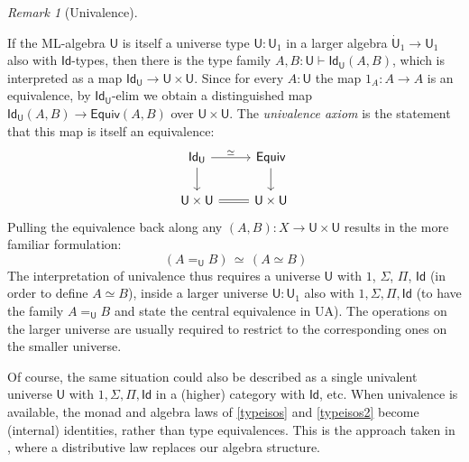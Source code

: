 \documentclass[12pt,reqno]{amsart}
\newcommand{\EE}{\ensuremath{\mathcal{E}}}
\renewcommand{\to}{\ensuremath{\rightarrow}}
\newcommand{\tto}{\ensuremath{\rightrightarrows}}
\newcommand{\Id}{\mathsf{Id}}
\newcommand{\T}{\ensuremath{\mathsf{U}}}
\newcommand{\TT}{\ensuremath{\dot{\mathsf{U}}}}
\theoremstyle{remark}
\newtheorem{remark}[theorem]{Remark}
\theoremstyle{definition}
\begin{document}
%

\begin{remark}[Univalence]\label{remark:univalence}

If the ML-algebra $\T$ is itself a universe type $\T : \T_1$ in a larger algebra $\TT_1 \to \T_1$ also with $\Id{}$-types, then there is the type family $A, B: \T \vdash \Id_{\T}(A,B)$, which is interpreted as a map $\Id_{\T}\to \T \times \T$.  Since for every $A:\T$ the map $1_A : A \to A$ is an equivalence, by $\Id_{\T}$-elim we obtain a distinguished map  $\Id_{\T}(A, B) \to \mathsf{Equiv}(A, B)$ over $\T \times \T$.  The \emph{univalence axiom} is the statement that this map is itself an equivalence:
\begin{equation}\label{diag:univalence4}
\begin{tikzcd} 
\Id_{\T} \ar[d] \ar[r, "{\simeq}"] & \mathsf{Equiv} \ar[d] \\  
 \T \times \T  \ar[r, equals] & \T \times \T
	 \end{tikzcd}
 \end{equation}
 Pulling the equivalence back along any $(A, B) : X \to \T \times \T$ results in the more familiar formulation:
 \[\tag{UA}
 \ (A =_\T B) \, \simeq\, (A \simeq B)
 \]
The interpretation of univalence thus requires a universe $\T$ with $1$, $\Sigma$, $\Pi$, $\Id{}$ (in order to define $A\simeq B$), inside a larger universe $\T:\T_1$ also with $1, \Sigma, \Pi, \Id{}$ (to have the family $A =_\T B$ and state the central equivalence in UA). The operations on the larger universe are usually required to restrict to the corresponding ones on the smaller universe.   

Of course, the same situation could also be described as a single univalent universe $\T$ with $1, \Sigma, \Pi, \Id{}$ in a (higher) category with $\Id{}$, etc.  When univalence is available, the monad and algebra laws of \eqref{typeisos} and \eqref{typeisos2}  become (internal) identities, rather than type equivalences.  This is the approach taken in \cite{AberleSpivak:2024}, where a distributive law replaces our algebra structure.
\end{remark}
\end{document}

